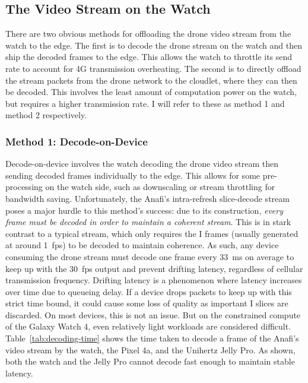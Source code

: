\subsection{The Video Stream on the Watch}
There are two obvious methods for offloading the drone video stream from the watch to the edge. The first is to decode the drone stream on the watch and then ship the decoded frames to the edge. This allows the watch to throttle its send rate to account for 4G transmission overheating. The second is to directly offload the stream packets from the drone network to the cloudlet, where they can then be decoded. This involves the least amount of computation power on the watch, but requires a higher transmission rate. I will refer to these as method 1 and method 2 respectively.

\subsubsection{Method 1: Decode-on-Device}
\label{sec:method-1}
Decode-on-device involves the watch decoding the drone video stream then sending decoded frames individually to the edge. This allows for some pre-processing on the watch side, such as downscaling or stream throttling for bandwidth saving. Unfortunately, the Anafi's intra-refresh slice-decode stream poses a major hurdle to this method's success: due to its construction, \textit{every frame must be decoded in order to maintain a coherent stream}. This is in stark contrast to a typical stream, which only requires the I frames (usually generated at around 1~fps) to be decoded to maintain coherence. As such, any device consuming the drone stream must decode one frame every 33~ms on average to keep up with the 30~fps output and prevent drifting latency, regardless of cellular transmission frequency. Drifting latency is a phenomenon where latency increases over time due to queueing delay. If a device drops packets to keep up with this strict time bound, it could cause some loss of quality as important I slices are discarded. On most devices, this is not an issue. But on the constrained compute of the Galaxy Watch 4, even relatively light workloads are considered difficult. Table~\ref{tab:decoding-time} shows the time taken to decode a frame of the Anafi's video stream by the watch, the Pixel 4a, and the Unihertz Jelly Pro. As shown, both the watch and the Jelly Pro cannot decode fast enough to maintain stable latency.

